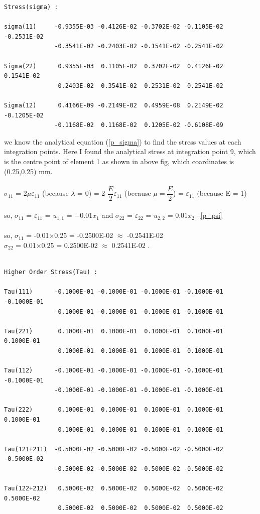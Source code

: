\documentclass[12pt]{article}
\begin{document}
\begin{verbatim}
Stress(sigma) :

sigma(11)     -0.9355E-03 -0.4126E-02 -0.3702E-02 -0.1105E-02 -0.2531E-02 
              -0.3541E-02 -0.2403E-02 -0.1541E-02 -0.2541E-02
 
Sigma(22)      0.9355E-03  0.1105E-02  0.3702E-02  0.4126E-02  0.1541E-02  
               0.2403E-02  0.3541E-02  0.2531E-02  0.2541E-02

Sigma(12)      0.4166E-09 -0.2149E-02  0.4959E-08  0.2149E-02 -0.1205E-02 
              -0.1168E-02  0.1168E-02  0.1205E-02 -0.6108E-09
\end{verbatim}
we know the analytical equation (\ref{p_sigma}) to find the stress values at each integration points.
Here I found the analytical stress at integration point 9, which is the centre point of element 1 as shown in above fig, which coardinates is (0.25,0.25) mm. \\ \\
$\sigma_{11}$ = 2$\mu\varepsilon_{11}$ (because $\lambda$ = 0) = 2 $\dfrac{E}{2}\varepsilon_{11}$ (because $\mu = \dfrac{E}{2}$) = $\varepsilon_{11}$ (because E = 1) \\ \\
so, $\sigma_{11}$ = $\varepsilon_{11}$ = $u_{1,1}$ = $-0.01x_1$  and $\sigma_{22}$ = $\varepsilon_{22}$ = $u_{2,2}$ = $0.01x_2$ --\ref{p_psi} \\ \\
so, $\sigma_{11}$ = -0.01$\times$0.25 = -0.2500E-02 $\approx$ -0.2541E-02 \\
    $\sigma_{22}$ = 0.01$\times$0.25 = 0.2500E-02 $\approx$ 0.2541E-02 .
\begin{verbatim}

Higher Order Stress(Tau) :

Tau(111)      -0.1000E-01 -0.1000E-01 -0.1000E-01 -0.1000E-01 -0.1000E-01 
              -0.1000E-01 -0.1000E-01 -0.1000E-01 -0.1000E-01
              
Tau(221)       0.1000E-01  0.1000E-01  0.1000E-01  0.1000E-01  0.1000E-01  
               0.1000E-01  0.1000E-01  0.1000E-01  0.1000E-01
               
Tau(112)      -0.1000E-01 -0.1000E-01 -0.1000E-01 -0.1000E-01 -0.1000E-01 
              -0.1000E-01 -0.1000E-01 -0.1000E-01 -0.1000E-01
              
Tau(222)       0.1000E-01  0.1000E-01  0.1000E-01  0.1000E-01  0.1000E-01  
               0.1000E-01  0.1000E-01  0.1000E-01  0.1000E-01
               
Tau(121+211)  -0.5000E-02 -0.5000E-02 -0.5000E-02 -0.5000E-02 -0.5000E-02 
              -0.5000E-02 -0.5000E-02 -0.5000E-02 -0.5000E-02
              
Tau(122+212)   0.5000E-02  0.5000E-02  0.5000E-02  0.5000E-02  0.5000E-02  
               0.5000E-02  0.5000E-02  0.5000E-02  0.5000E-02
               
\end{verbatim}
\end{document}
